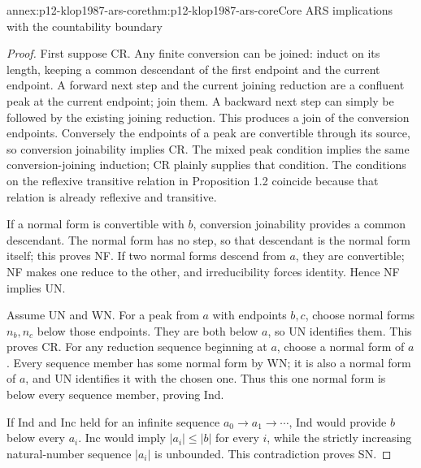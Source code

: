 \begin{annexitem}{annex:p12-klop1987-ars-core}{thm:p12-klop1987-ars-core}{Core ARS implications with the countability boundary}
\begin{proof}
First suppose CR. Any finite conversion can be joined: induct on its
length, keeping a common descendant of the first endpoint and the current
endpoint. A forward next step and the current joining reduction are a
confluent peak at the current endpoint; join them. A backward next step
can simply be followed by the existing joining reduction. This produces
a join of the conversion endpoints. Conversely the endpoints of a peak
are convertible through its source, so conversion joinability implies CR.
The mixed peak condition implies the same conversion-joining induction;
CR plainly supplies that condition. The conditions on the reflexive
transitive relation in Proposition 1.2 coincide because that relation is
already reflexive and transitive.

If a normal form is convertible with \(b\), conversion joinability
provides a common descendant. The normal form has no step, so that
descendant is the normal form itself; this proves NF. If two normal forms
descend from \(a\), they are convertible; NF makes one reduce to the
other, and irreducibility forces identity. Hence NF implies UN.

Assume UN and WN. For a peak from \(a\) with endpoints \(b,c\),
choose normal forms \(n_b,n_c\) below those endpoints. They are both
below \(a\), so UN identifies them. This proves CR. For any reduction
sequence beginning at \(a\), choose a normal form of \(a\).
Every sequence member has some normal form by WN; it is also a normal
form of \(a\), and UN identifies it with the chosen one. Thus this one
normal form is below every sequence member, proving Ind.

If Ind and Inc held for an infinite sequence \(a_0\to a_1\to\cdots\),
Ind would provide \(b\) below every \(a_i\). Inc would imply
\(|a_i|\leq|b|\) for every \(i\), while the strictly increasing
natural-number sequence \(|a_i|\) is unbounded. This contradiction
proves SN.


\end{proof}
\end{annexitem}
